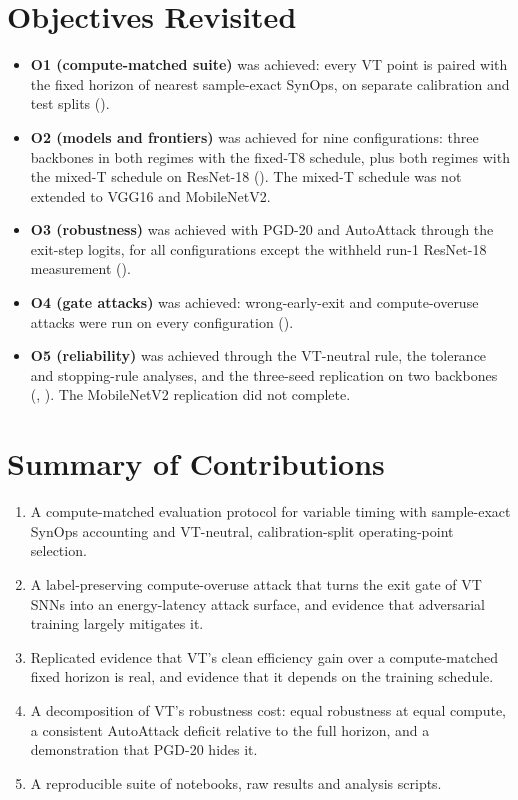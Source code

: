 \section{Objectives Revisited}
\label{sec:con-objectives}

\begin{itemize}
    \item \textbf{O1 (compute-matched suite)} was achieved: every VT point is paired with the fixed horizon of nearest sample-exact SynOps, on separate calibration and test splits ().
    \item \textbf{O2 (models and frontiers)} was achieved for nine configurations: three backbones in both regimes with the fixed-T8 schedule, plus both regimes with the mixed-T schedule on ResNet-18 (). The mixed-T schedule was not extended to VGG16 and MobileNetV2.
    \item \textbf{O3 (robustness)} was achieved with PGD-20 and AutoAttack through the exit-step logits, for all configurations except the withheld run-1 ResNet-18 measurement ().
    \item \textbf{O4 (gate attacks)} was achieved: wrong-early-exit and compute-overuse attacks were run on every configuration ().
    \item \textbf{O5 (reliability)} was achieved through the VT-neutral rule, the tolerance and stopping-rule analyses, and the three-seed replication on two backbones (, ). The MobileNetV2 replication did not complete.
\end{itemize}

\section{Summary of Contributions}
\label{sec:con-contrib}

\begin{enumerate}[label=\textbf{C\arabic*.}, leftmargin=1.2cm]
    \item A compute-matched evaluation protocol for variable timing with sample-exact SynOps accounting and VT-neutral, calibration-split operating-point selection.
    \item A label-preserving compute-overuse attack that turns the exit gate of VT SNNs into an energy-latency attack surface, and evidence that adversarial training largely mitigates it.
    \item Replicated evidence that VT's clean efficiency gain over a compute-matched fixed horizon is real, and evidence that it depends on the training schedule.
    \item A decomposition of VT's robustness cost: equal robustness at equal compute, a consistent AutoAttack deficit relative to the full horizon, and a demonstration that PGD-20 hides it.
    \item A reproducible suite of notebooks, raw results and analysis scripts.
\end{enumerate}


